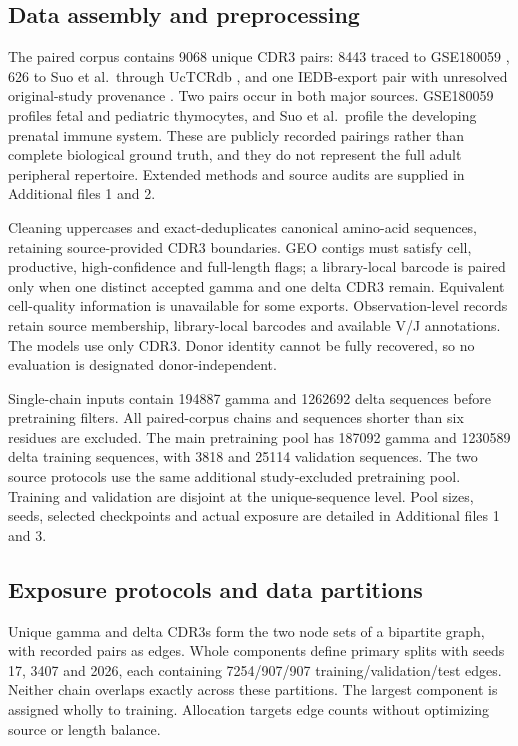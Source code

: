 \documentclass[a4paper,11pt]{article}
\begin{document}
\subsection{Data assembly and preprocessing}
The paired corpus contains 9068 unique CDR3 pairs: 8443 traced to GSE180059
\cite{gse180059}, 626 to Suo et al.\ through UcTCRdb \cite{suo2022,uctcrdb},
and one IEDB-export pair with unresolved original-study provenance \cite{iedb}.
Two pairs occur in both major sources. GSE180059 profiles fetal and pediatric
thymocytes, and Suo et al.\ profile the developing prenatal immune system.
These are publicly recorded pairings rather than complete biological ground
truth, and they do not represent the full adult peripheral repertoire.
Extended methods and source audits are supplied in Additional files 1 and 2.

Cleaning uppercases and exact-deduplicates canonical amino-acid sequences,
retaining source-provided CDR3 boundaries. GEO contigs must satisfy cell,
productive, high-confidence and full-length flags; a library-local barcode is
paired only when one distinct accepted gamma and one delta CDR3 remain.
Equivalent cell-quality information is unavailable for some exports.
Observation-level records retain source membership, library-local barcodes and
available V/J annotations. The models use only CDR3. Donor identity cannot be
fully recovered, so no evaluation is designated donor-independent.

Single-chain inputs contain 194887 gamma and 1262692 delta sequences before
pretraining filters. All paired-corpus chains and sequences shorter than six
residues are excluded. The main pretraining pool has 187092 gamma and 1230589
delta training sequences, with 3818 and 25114 validation sequences.
The two source protocols use the same additional study-excluded pretraining
pool. Training and validation are disjoint at the unique-sequence level.
Pool sizes, seeds, selected checkpoints and actual exposure are detailed in
Additional files 1 and 3.

\subsection{Exposure protocols and data partitions}
Unique gamma and delta CDR3s form the two node sets of a bipartite graph, with
recorded pairs as edges. Whole components define primary splits with seeds
17, 3407 and 2026, each containing 7254/907/907 training/validation/test edges.
Neither chain overlaps exactly across these partitions. The largest component
is assigned wholly to training. Allocation targets edge counts without
optimizing source or length balance.
\end{document}
